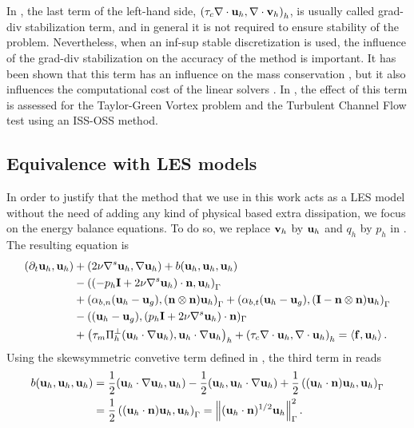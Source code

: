 In , the last term of the left-hand side, $ \left(\tau_c\nabla\cdot{\bf u}_h,\nabla\cdot{\bf v}_h\right)_h $, is usually called grad-div stabilization term, and in general it is not required to ensure stability of the problem. Nevertheless, when an inf-sup stable discretization is used, the influence of the grad-div stabilization on the accuracy of the method is important. It has been shown that this term has an influence on the mass conservation \cite{linke_collision_2009}, but it also influences the computational cost of the linear solvers \cite{olshanskii_grad-div_2004,heister_efficient_2013}. In , the effect of this term is assessed for the Taylor-Green Vortex problem and the Turbulent Channel Flow test using an ISS-OSS method.

\subsection{Equivalence with LES models}
\label{subsec-C7_tbt_OSS_ISS}
In order to justify that the method that we use in this work acts as a LES model without the need of adding any kind of physical based extra dissipation, we focus on the energy balance equations. To do so, we replace $ {\bf v}_h $ by $ {\bf u}_h $ and $ q_h $ by $ p_h $ in . The resulting equation is
\begin{align}
\label{eq-C7_NS_ene_balance_1}
(\partial_t{\bf u}_h,{\bf u}_h)&+(2\nu\nabla^s{\bf u}_h,\nabla{\bf u}_h)+b({\bf u}_h,{\bf u}_h,{\bf u}_h)\\\nonumber
&-\left((-p_h\mathbf{I}+2\nu\nabla^s{\bf u}_h)\cdot{\bf n},{\bf u}_h\right)_\Gamma\\\nonumber&+\left(\alpha_{b,n}({\bf u}_h-{\bf u}_g),({\bf n}\otimes{\bf n}){\bf u}_h\right)_\Gamma+\left(\alpha_{b,t}({\bf u}_h-{\bf u}_g),(\mathbf{I}-{\bf n}\otimes{\bf n}){\bf u}_h\right)_\Gamma\\\nonumber
&-(({\bf u}_h-{\bf u}_g),(p_h\mathbf{I}+2\nu\nabla^s{\bf u}_h)\cdot{\bf n})_\Gamma\\\nonumber
&+\left(\tau_m\Pi_h^\perp({\bf u}_h\cdot\nabla{\bf u}_h),{\bf u}_h\cdot\nabla{\bf u}_h\right)_h+\left(\tau_c\nabla\cdot{\bf u}_h,\nabla\cdot{\bf u}_h\right)_h=\left\langle{\bf f},{\bf u}_h\right\rangle.
\end{align}
Using the skewsymmetric convetive term defined in , the third term in  reads
\begin{align*}
b({\bf u}_h,{\bf u}_h,{\bf u}_h)&=\frac{1}{2}({\bf u}_h\cdot\nabla{\bf u}_h,{\bf u}_h)-\frac{1}{2}({\bf u}_h,{\bf u}_h\cdot\nabla{\bf u}_h)+\frac{1}{2}\left(({\bf u}_h\cdot{\bf n}){\bf u}_h,{\bf u}_h\right)_\Gamma\\
&=\frac{1}{2}\left(({\bf u}_h\cdot{\bf n}){\bf u}_h,{\bf u}_h\right)_\Gamma=\left\|({\bf u}_h\cdot{\bf n})^{1/2}{\bf u}_h\right\|^2_\Gamma.
\end{align*}
